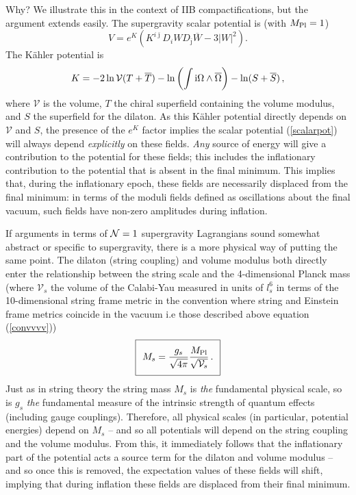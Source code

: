 Why? We illustrate this in the context of IIB compactifications, but the argument extends easily. The supergravity scalar potential
is (with $M_{\rm Pl} =1$)
\begin{equation}
\label{scalarpot}
V = e^K \left( K^{i \bar{\jmath}} D_i W D_{\bar{\jmath}} \overline{W} - 3 \vert W \vert^2 \right).
\end{equation}
The K\"ahler potential is
\begin{equation}
K = - 2 \ln \mathcal{V}(T + \overline{T}) - \ln \left( \int {\rm i} \Omega \wedge \overline{\Omega} \right) - \ln (S + \overline{S})\,,
\end{equation}
where $\mathcal{V}$ is the volume, $T$ the chiral superfield containing the volume modulus, and $S$ the superfield for the dilaton. As this K\"ahler potential directly depends on $\mathcal{V}$ and $S$, the presence of the $e^K$ factor implies the scalar potential (\ref{scalarpot}) will always depend \emph{explicitly} on these fields. \emph{Any} source of energy will give a contribution to the potential for these fields; this includes the inflationary contribution to the potential that is absent in the final minimum. This implies that, during the inflationary epoch, these fields are necessarily displaced from the final minimum: in terms of the moduli fields defined as oscillations about the final vacuum, such fields have non-zero amplitudes during inflation.

If arguments in terms of ${\cal N}=1$ supergravity Lagrangians sound somewhat abstract or specific to supergravity, there is a more physical way of putting the same point. The dilaton (string coupling) and volume modulus both directly enter the relationship between the string scale and the 4-dimensional Planck mass (where $\mathcal{V}_s$ the volume of the Calabi-Yau measured in units of $l_s^6$ in terms of the 10-dimensional string frame metric in the convention where string and Einstein frame metrics coincide in the vacuum i.e those described above equation (\ref{convvvv}))
\begin{equation}
\setlength\fboxsep{0.25cm}
\setlength\fboxrule{0.4pt}
\boxed{
M_s = \frac{g_s}{\sqrt{4\pi}} \frac{ M_{\rm Pl}}{\sqrt{\mathcal{V}_s}}\,.
}
\end{equation}
Just as in string theory the string mass $M_s$ is \emph{the} fundamental physical scale, so is $g_s$ \emph{the} fundamental measure of the intrinsic 
strength of quantum effects (including gauge couplings). Therefore, all physical scales (in particular, potential energies) depend on $M_s$ -- and so all potentials will depend on the string coupling and the volume modulus. From this, it immediately follows that the inflationary part of the potential acts a source term for the dilaton and volume modulus -- and so once this is removed, the expectation values of these fields will shift, implying that during inflation these fields are displaced from their final minimum.

